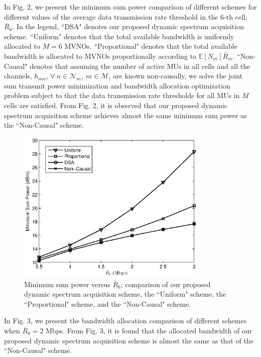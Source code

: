 \documentclass[journal]{IEEEtran}
\begin{document}
In Fig. 2, we present the minimum sum power comparison of different schemes for different values of the average data transmission rate threshold in the 6-th cell, $\bar{R}_6$. In the legend, ``DSA" denotes our proposed dynamic spectrum acquisition scheme. ``Uniform" denotes that the total available bandwidth is uniformly allocated to $M=6$ MVNOs. ``Proportional" denotes that the total available bandwidth is allocated to MVNOs proportionally according to $\mathbb{E}[N_m]\bar{R}_m$. ``Non-Causal" denotes that assuming the number of active MUs in all cells and all the channels, $h_{mn}$, $\forall\ n\in\mathcal{N}_m,\ m\in\mathcal{M}$, are known non-causally, we solve the joint sum transmit power minimization and bandwidth allocation optimization problem subject to that the data transmission rate thresholds for all MUs in $M$ cells are satisfied. From Fig. 2, it is observed that our proposed dynamic spectrum acquisition scheme achieves almost the same minimum sum power as the ``Non-Causal" scheme.

\begin{figure}
\centering
\includegraphics[width=3.6in]{fig2.eps}
\caption{Minimum sum power versus $\bar{R}_6$; comparison of our proposed dynamic spectrum acquisition scheme, the ``Uniform" scheme, the ``Proportional" scheme, and the ``Non-Causal" scheme.}
\end{figure}

In Fig. 3, we present the bandwidth allocation comparison of different schemes when $\bar{R}_6=2$ Mbps. From Fig. 3, it is found that the allocated bandwidth of our proposed dynamic spectrum acquisition scheme is almost the same as that of the ``Non-Causal" scheme.
\end{document}
